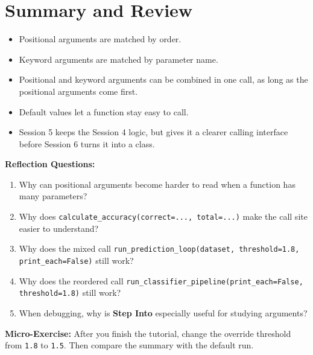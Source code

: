 \section{Summary and Review}
\begin{itemize}
    \item Positional arguments are matched by order.
    \item Keyword arguments are matched by parameter name.
    \item Positional and keyword arguments can be combined in one call, as long as the positional arguments come first.
    \item Default values let a function stay easy to call.
    \item Session 5 keeps the Session 4 logic, but gives it a clearer calling interface before Session 6 turns it into a class.
\end{itemize}

\textbf{Reflection Questions:}
\begin{enumerate}
    \item Why can positional arguments become harder to read when a function has many parameters?
    \item Why does \texttt{calculate\_accuracy(correct=..., total=...)} make the call site easier to understand?
    \item Why does the mixed call \texttt{run\_prediction\_loop(dataset, threshold=1.8, print\_each=False)} still work?
    \item Why does the reordered call \texttt{run\_classifier\_pipeline(print\_each=False, threshold=1.8)} still work?
    \item When debugging, why is \textbf{Step Into} especially useful for studying arguments?
\end{enumerate}

\textbf{Micro-Exercise:} After you finish the tutorial, change the override threshold from \texttt{1.8} to \texttt{1.5}. Then compare the summary with the default run.
